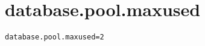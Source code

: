 \section{database.pool.maxused}
\label{configuration:DatabasePoolMaxused}
\ClearAPI
\TODO
{}
\begin{lstlisting}[style=Props,caption={Usage example for \textit{database.pool.maxused}}]
database.pool.maxused=2
\end{lstlisting}